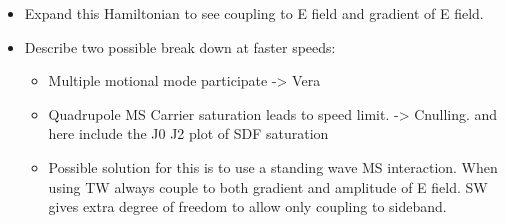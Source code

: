 \documentclass[12pt]{iopart}
\begin{document}
\begin{itemize}
\item Expand this Hamiltonian to see coupling to E field and gradient of E field.
\item Describe two possible break down at faster speeds:
    \begin{itemize}
    \item Multiple motional mode participate -> Vera
    \item Quadrupole MS Carrier saturation leads to speed limit. ->
        Cnulling. and here include the J0 J2 plot of SDF saturation
    \item Possible solution for this is to use a standing wave MS
  interaction. When using TW always couple to both gradient and
  amplitude of E field. SW gives extra degree of freedom to allow only
  coupling to sideband.
\end{itemize}
\end{itemize}

\end{document}
